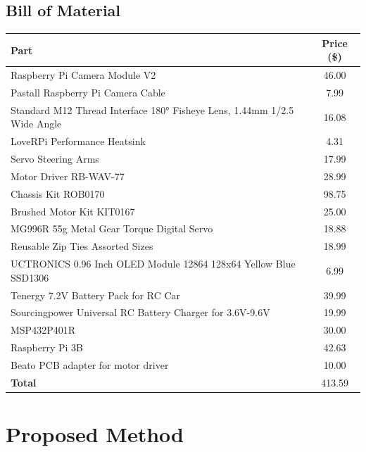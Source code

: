 \documentclass{article}
\begin{document}
\subsection{Bill of Material}


\begin{table}[htb]
	\renewcommand{\arraystretch}{1.2}
	\begin{tabularx}{\columnwidth}{|>{\raggedright\arraybackslash}X|c|}
		\hline
		Part & Price (\$)\\
		\hline
		Raspberry Pi Camera Module V2 & 46.00 \\\hline
		Pastall Raspberry Pi Camera Cable & 7.99 \\\hline
		Standard M12 Thread Interface 180° Fisheye Lens, 1.44mm 1/2.5 Wide Angle & 16.08 \\\hline
		LoveRPi Performance Heatsink & 4.31\\\hline
		Servo Steering Arms & 17.99\\\hline
		Motor Driver RB-WAV-77 & 28.99\\\hline
		Chassis Kit ROB0170 & 98.75\\\hline
		Brushed Motor Kit KIT0167 & 25.00\\\hline
		MG996R 55g Metal Gear Torque Digital Servo & 18.88\\\hline
		Reusable Zip Ties Assorted Sizes & 18.99\\\hline
		UCTRONICS 0.96 Inch OLED Module 12864 128x64 Yellow Blue SSD1306 & 6.99\\\hline
		Tenergy 7.2V Battery Pack for RC Car & 39.99\\\hline
		Sourcingpower Universal RC Battery Charger for 3.6V-9.6V & 19.99\\\hline
		MSP432P401R & 30.00\\\hline
		Raspberry Pi 3B & 42.63\\\hline
		Beato PCB adapter for motor driver & 10.00\\\hline
		\textbf{Total} & 413.59 \\\hline
	\end{tabularx}
	\label{tab:bom}
\end{table}

\section{Proposed Method}
\end{document}
